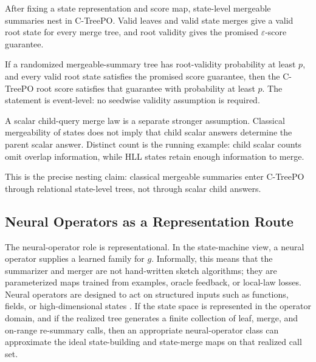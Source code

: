 \begin{proposition}
\label{prop:v6-state-level-correspondence}
After fixing a state representation and score map, state-level mergeable
summaries nest in C-TreePO.  Valid leaves and valid state merges give a valid
root state for every merge tree, and root validity gives the promised
\(\varepsilon\)-score guarantee.
\end{proposition}

\begin{corollary}
\label{thm:v6-randomized-root-success}
If a randomized mergeable-summary tree has root-validity probability at
least \(p\), and every valid root state satisfies the promised score
guarantee, then the C-TreePO root score satisfies that guarantee with
probability at least \(p\).  The statement is event-level: no seedwise
validity assumption is required.
\end{corollary}

\begin{remark}
\label{thm:v6-scalar-query-caveat}
A scalar child-query merge law is a separate stronger assumption.  Classical
mergeability of states does not imply that child scalar answers determine the
parent scalar answer.  Distinct count is the running example: child scalar
counts omit overlap information, while HLL states retain enough information to
merge.
\end{remark}

This is the precise nesting claim: classical mergeable summaries enter
C-TreePO through relational state-level trees, not through scalar child
answers.

\subsection{Neural Operators as a Representation Route}
\label{app:v6-neural-operator-route}

The neural-operator role is representational.  In the state-machine view, a
neural operator supplies a learned family for \(g\).  Informally, this means
that the summarizer and merger are not hand-written sketch algorithms; they
are parameterized maps trained from examples, oracle feedback, or local-law
losses.  Neural operators are designed to act on structured inputs such as
functions, fields, or high-dimensional states \citep{Kovachki23NeuralOperator}.
If the state space is represented in the operator domain, and if the realized
tree generates a finite collection of leaf, merge, and on-range re-summary
calls, then an appropriate neural-operator class can approximate the ideal
state-building and state-merge maps on that realized call set.


